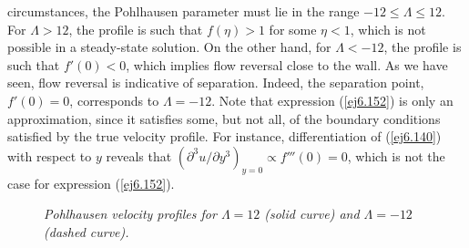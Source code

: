 circumstances, 
the Pohlhausen parameter must lie in the range $-12\leq \Lambda\leq 12$. For $\Lambda> 12$, the
profile is such that $f(\eta)>1$ for some $\eta<1$, which is not possible in a steady-state solution. On the
other hand, for $\Lambda<-12$, the profile is such that $f'(0)<0$, which implies flow reversal close to the wall.
As we have seen,   flow reversal is indicative of separation. Indeed, the separation
point, $f'(0)=0$, corresponds to $\Lambda=-12$. Note that expression (\ref{ej6.152}) is only an approximation, since
it satisfies some, but not all, of the boundary conditions satisfied by the true velocity profile. For instance, differentiation
of (\ref{ej6.140}) with respect to $y$ reveals that $(\partial^3 u/\partial y^3)_{y=0}\propto f'''(0)=0$, which is not the case for expression (\ref{ej6.152}).

\begin{figure}
\epsfysize=3.5in
\centerline{}
\caption{\em Pohlhausen velocity profiles for $\Lambda=12$ (solid curve) and $\Lambda=-12$ (dashed curve).}\label{fpohl}
\end{figure}

